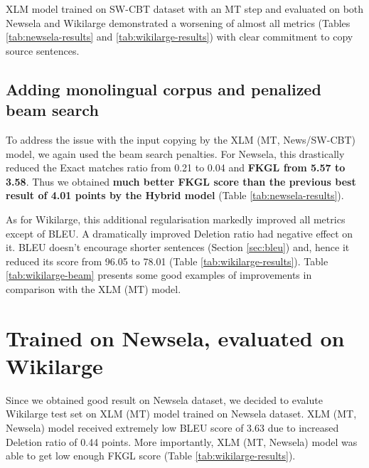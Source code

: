 XLM model trained on SW-CBT dataset with an MT step and evaluated on both Newsela and Wikilarge demonstrated a worsening of almost all metrics (Tables \ref{tab:newsela-results} and \ref{tab:wikilarge-results}) with clear commitment to copy source sentences. 

\subsection{Adding monolingual corpus and penalized beam search}

To address the issue with the input copying by the XLM (MT, News/SW-CBT) model, we again used the beam search penalties. For Newsela, this drastically reduced the Exact matches ratio from 0.21 to 0.04 and \textbf{FKGL from 5.57 to 3.58}. Thus we obtained \textbf{much better FKGL score than the previous best result of 4.01 points by the Hybrid model} (Table \ref{tab:newsela-results}). 

As for Wikilarge, this additional regularisation markedly improved all metrics except of BLEU. A dramatically improved Deletion ratio had negative effect on it. BLEU doesn't encourage shorter sentences (Section \ref{sec:bleu}) and, hence it reduced its score from 96.05 to 78.01 (Table \ref{tab:wikilarge-results}). Table \ref{tab:wikilarge-beam} presents some good examples of improvements in comparison with the XLM (MT) model.


\section{Trained on Newsela, evaluated on Wikilarge}

Since we obtained good result on Newsela dataset, we decided to evalute Wikilarge test set on XLM (MT) model trained on Newsela dataset. XLM (MT, Newsela) model received extremely low BLEU score of 3.63 due to increased Deletion ratio of 0.44 points. More importantly, XLM (MT, Newsela) model was able to get low enough FKGL score (Table \ref{tab:wikilarge-results}).


